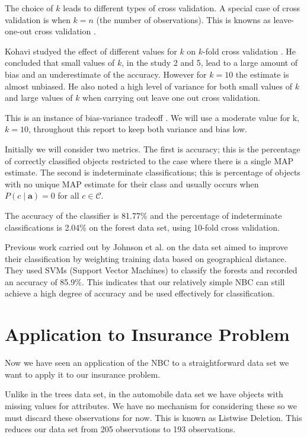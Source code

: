 The choice of $k$ leads to different types of cross validation.
A special case of cross validation is when $k=n$ (the number of observations).
This is knowns as leave-one-out cross validation \cite{Priddy05}.

Kohavi studyed the effect of different values for $k$ on $k$-fold cross validation \cite{Kohavi95}.
He concluded that small values of $k$, in the study 2 and 5, lead to a large amount of bias and an underestimate of the accuracy.
However for $k=10$ the estimate is almost unbiased.
He also noted a high level of variance for both small values of $k$ and large values of $k$ when carrying out leave one out cross validation.

This is an instance of bias-variance tradeoff \cite{James13}.
We will use a moderate value for k, $k=10$, throughout this report to keep both variance and bias low.

Initially we will consider two metrics.
The first is accuracy; this is the percentage of correctly classified objects restricted to the case where there is a single MAP estimate.
The second is indeterminate classifications; this is percentage of objects with no unique MAP estimate for their class and usually occurs when $P(c \mid \mathbf{a}) = 0$ for all $c \in \mathcal{C}$.

The accuracy of the classifier is 81.77\% and the percentage of indeterminate classifications is 2.04\% on the forest data set, using 10-fold cross validation.

Previous work carried out by Johnson et al. \cite{Johnson12} on the data set aimed to improve their classification by weighting training data based on geographical distance.
They used SVMs (Support Vector Machines) to classify the forests and recorded an accuracy of 85.9\%.
This indicates that our relatively simple NBC can still achieve a high degree of accuracy and be used effectively for classification.

\section{Application to Insurance Problem}

Now we have seen an application of the NBC to a straightforward data set we want to apply it to our insurance problem.

Unlike in the trees data set, in the automobile data set we have objects with missing values for attributes.
We have no mechanism for considering these so we must discard these observations for now.
This is known as Listwise Deletion.
This reduces our data set from 205 observations to 193 observations.

